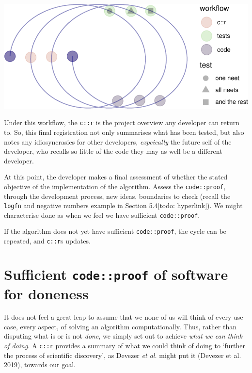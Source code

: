 \documentclass[
]{article}
\begin{document}
\begin{center}\includegraphics{when-is-done-done_files/figure-latex/unnamed-chunk-10-1} \end{center}

Under this workflow, the \texttt{c::r} is the project overview any
developer can return to. So, this final registration not only summarises
what has been tested, but also notes any idiosyncrasies for other
developers, \emph{expeically} the future self of the developer, who
recalls so little of the code they may as well be a different developer.

At this point, the developer makes a final assessment of whether the
stated objective of the implementation of the algorithm. Assess the
\texttt{code::proof}, through the development process, new ideas,
boundaries to check (recall the \texttt{logfn} and negative numbers
example in Section 5.4{[}todo: hyperlink{]}). We might characterise done
as when we feel we have sufficient \texttt{code::proof}.

If the algorithm does not yet have sufficient \texttt{code::proof}, the
cycle can be repeated, and \texttt{c::r}s updates.

\hypertarget{sufficient-codeproof-of-software-for-doneness}{%
\section{\texorpdfstring{Sufficient \texttt{code::proof} of software for
doneness}{Sufficient code::proof of software for doneness}}\label{sufficient-codeproof-of-software-for-doneness}}

It does not feel a great leap to assume that we none of us will think of
every use case, every aspect, of solving an algorithm computationally.
Thus, rather than disputing what is or is not \emph{done}, we simply set
out to achieve \emph{what we can think of doing}. A \texttt{c::r}
provides a summary of what we could think of doing to `further the
process of scientific discovery', as Devezer \emph{et al.} might put it
(Devezer et al. 2019), towards our goal.
\end{document}
